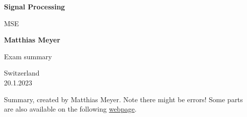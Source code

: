 \documentclass[12pt]{article}
\begin{document}
\begin{titlepage}
    \begin{center}
        \vspace*{1cm}
            
        \Huge
        \textbf{Signal Processing}
            
        \vspace{0.5cm}
        \LARGE
        MSE
            
        \vspace{1.5cm}
            
        \textbf{Matthias Meyer}
            
        \vfill
            
        Exam summary\\
            
        \vspace{0.8cm}
            
            
        \Large
        Switzerland\\
        20.1.2023
            
    \end{center}
\end{titlepage}
Summary, created by Matthias Meyer. Note there might be errors!
\tableofcontents 
Some parts are also available on the following \href{https://mmeyer.tech/category/knowledge/math/}{webpage}.

























\end{document}
